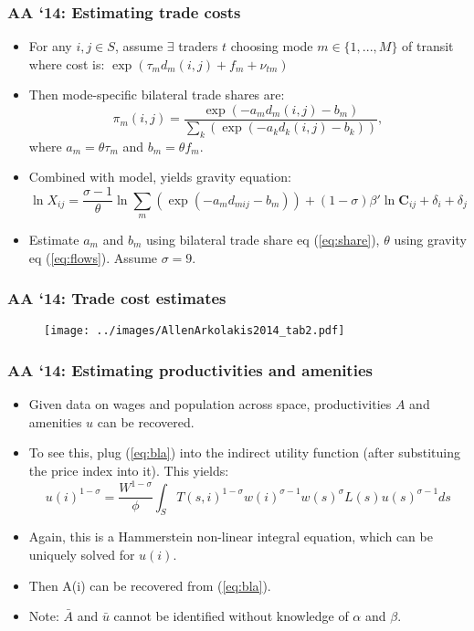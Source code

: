 \documentclass[10pt,notes=hide]{beamer}
\begin{document}
\begin{frame}
\frametitle{AA `14: Estimating trade costs}
\begin{itemize}
\item For any $i,j\in S$, assume $\exists$ traders $t$ choosing mode $m\in\{1,...,M\}$ of transit where cost is: $\exp\left(\tau_{m}d_{m}\left(i,j\right)+f_{m}+\nu_{tm}\right)$
 
\item Then mode-specific bilateral trade shares are:
\begin{equation} \label{eq:share}
\pi_{m}\left(i,j\right)=\frac{\exp\left(-a_{m}d_{m}\left(i,j\right)-b_{m}\right)}{\sum_{k}\left(\exp\left(-a_{k}d_{k}\left(i,j\right)-b_{k}\right)\right)},
\end{equation}
  where $a_{m} = \theta\tau_{m}$ and $b_{m} = \theta f_{m}$. 
  
\item Combined with model, yields gravity equation:
\begin{equation} \label{eq:flows}
\ln X_{ij}=\frac{\sigma-1}{\theta}\ln\sum_{m}\left(\exp\left(-a_{m}d_{mij}-b_{m}\right)\right)+\left(1-\sigma\right)\beta'\ln\mathbf{C}_{ij}+\delta_{i}+\delta_{j}
 \end{equation}
\item Estimate $a_{m}$ and $b_{m}$ using bilateral trade share eq (\ref{eq:share}), $\theta$ using gravity eq  (\ref{eq:flows}). Assume $\sigma = 9$.
\end{itemize}
\end{frame}
\begin{frame}
\frametitle{AA `14: Trade cost estimates}
\begin{figure}[htbp] \centering
\texttt{[image: ../images/AllenArkolakis2014\_tab2.pdf]}
\end{figure}
\end{frame}
\begin{frame}
\frametitle{AA `14: Estimating productivities and amenities}
\begin{itemize}
\item Given data on wages and population across space, productivities $A$ and amenities $u$ can be recovered. 
\item To see this, plug (\ref{eq:bla}) into the indirect utility function (after substituing the price index into it). This yields:
\begin{equation*}
u(i)^{1-\sigma} = \frac{W^{1-\sigma}}{\phi} \int_{S} T(s,i)^{1-\sigma} w(i)^{\sigma-1} w(s)^{\sigma}L(s)u(s)^{\sigma-1}ds 
\end{equation*}
\item Again, this is a Hammerstein non-linear integral equation, which can be uniquely solved for $u(i)$. 
\item Then A(i) can be recovered from (\ref{eq:bla}).
\item Note: $\bar{A}$   and $\bar{u}$ cannot be identified without knowledge of $\alpha$ and $\beta$.
\end{itemize}
\end{frame}
\end{document}

